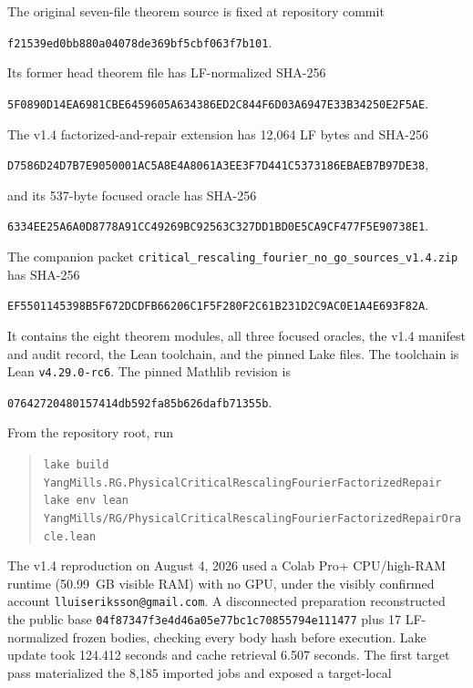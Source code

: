 \documentclass[11pt]{article}
\theoremstyle{definition}
\newcommand{\lean}[1]{\texttt{#1}}
\newcommand{\codepath}[1]{\nolinkurl{#1}}
\begin{document}
The original seven-file theorem source is fixed at repository commit
\begin{center}
\lean{f21539ed0bb880a04078de369bf5cbf063f7b101}.
\end{center}
Its former head theorem file has LF-normalized SHA-256
\begin{center}
\lean{5F0890D14EA6981CBE6459605A634386ED2C844F6D03A6947E33B34250E2F5AE}.
\end{center}
The v1.4 factorized-and-repair extension has 12,064 LF bytes and SHA-256
\begin{center}
\lean{D7586D24D7B7E9050001AC5A8E4A8061A3EE3F7D441C5373186EBAEB7B97DE38},
\end{center}
and its 537-byte focused oracle has SHA-256
\begin{center}
\lean{6334EE25A6A0D8778A91CC49269BC92563C327DD1BD0E5CA9CF477F5E90738E1}.
\end{center}
The companion packet
\codepath{critical_rescaling_fourier_no_go_sources_v1.4.zip} has SHA-256
\begin{center}
\lean{EF5501145398B5F672DCDFB66206C1F5F280F2C61B231D2C9AC0E1A4E693F82A}.
\end{center}
It contains the eight theorem modules, all three focused oracles, the v1.4
manifest and audit record, the Lean toolchain, and the pinned Lake files.  The
toolchain is Lean \lean{v4.29.0-rc6}.  The pinned Mathlib revision is
\begin{center}
\lean{07642720480157414db592fa85b626dafb71355b}.
\end{center}
From the repository root, run
\begin{quote}
\footnotesize
\lean{lake build}\\
\codepath{YangMills.RG.PhysicalCriticalRescalingFourierFactorizedRepair}
\\[0.3em]
\lean{lake env lean}\\
\codepath{YangMills/RG/PhysicalCriticalRescalingFourierFactorizedRepairOracle.lean}
\end{quote}
The v1.4 reproduction on August 4, 2026 used a Colab Pro+ CPU/high-RAM runtime
(50.99~GB visible RAM) with no GPU, under the visibly confirmed account
\lean{lluiseriksson@gmail.com}.  A disconnected preparation reconstructed the
public base \lean{04f87347f3e4d46a05e77bc1c70855794e111477} plus 17
LF-normalized frozen bodies, checking every body hash before execution.  Lake
update took 124.412 seconds and cache retrieval 6.507 seconds.  The first
target pass materialized the 8,185 imported jobs and exposed a target-local
\end{document}
